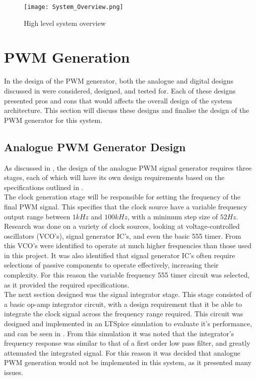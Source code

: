 \begin{figure}[!h]
    \texttt{[image: System\_Overview.png]}
    \caption{High level system overview}
    \label{F:sys_overview}
\end{figure}


%
%

\section{PWM Generation}\label{S:pwm_gen_design}

In the design of the PWM generator, both the analogue and digital designs discussed in  were considered, designed, and tested for. Each of these designs presented pros and cons that would affects the overall design of the system architecture. This section will discuss these designs and finalise the design of the PWM generator for this system. 

\subsection{Analogue PWM Generator Design}\label{S:PWM_analogue_design}

As discussed in , the design of the analogue PWM signal generator requires three stages, each of which will have its own design requirements based on the specifications outlined in . \\

The clock generation stage will be responsible for setting the frequency of the final PWM signal. This specifies that the clock source have a variable frequency output range between $1kHz$ and $100kHz$, with a minimum step size of $52Hz$. Research was done on a variety of clock sources, looking at voltage-controlled oscillators (VCO's), signal generator IC's, and even the basic 555 timer. From this VCO's were identified to operate at much higher frequencies than those used in this project. It was also identified that signal generator IC's often require selections of passive components to operate effectively, increasing their complexity. For this reason the variable frequency 555 timer circuit was selected, as it provided the required specifications.\\

The next section designed was the signal integrator stage. This stage consisted of a basic op-amp integrator circuit, with a design requirement that it be able to integrate the clock signal across the frequency range required. This circuit was designed and implemented in an LTSpice simulation to evaluate it's performance, and can be seen in . From this simulation it was noted that the integrator's frequency response was similar to that of a first order low pass filter, and greatly attenuated the integrated signal. For this reason it was decided that analogue PWM generation would not be implemented in this system, as it presented many issues.

